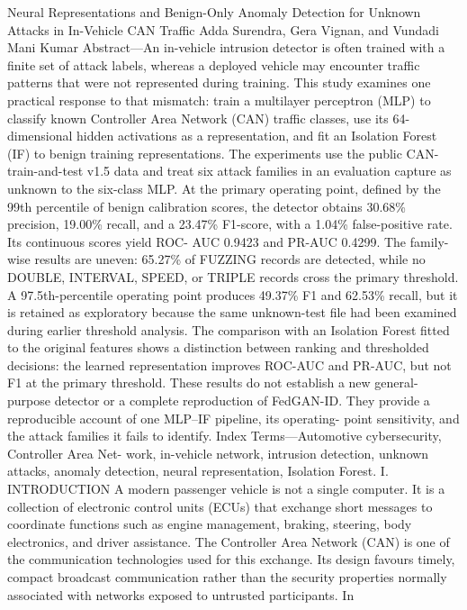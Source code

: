 \documentclass[
]{article}
\author{}
\date{}
\begin{document}
Neural Representations and Benign-Only Anomaly Detection for Unknown
Attacks in In-Vehicle CAN Traffic Adda Surendra, Gera Vignan, and
Vundadi Mani Kumar Abstract---An in-vehicle intrusion detector is often
trained with a finite set of attack labels, whereas a deployed vehicle
may encounter traffic patterns that were not represented during
training. This study examines one practical response to that mismatch:
train a multilayer perceptron (MLP) to classify known Controller Area
Network (CAN) traffic classes, use its 64- dimensional hidden
activations as a representation, and fit an Isolation Forest (IF) to
benign training representations. The experiments use the public
CAN-train-and-test v1.5 data and treat six attack families in an
evaluation capture as unknown to the six-class MLP. At the primary
operating point, defined by the 99th percentile of benign calibration
scores, the detector obtains 30.68\% precision, 19.00\% recall, and a
23.47\% F1-score, with a 1.04\% false-positive rate. Its continuous
scores yield ROC- AUC 0.9423 and PR-AUC 0.4299. The family-wise results
are uneven: 65.27\% of FUZZING records are detected, while no DOUBLE,
INTERVAL, SPEED, or TRIPLE records cross the primary threshold. A
97.5th-percentile operating point produces 49.37\% F1 and 62.53\%
recall, but it is retained as exploratory because the same unknown-test
file had been examined during earlier threshold analysis. The comparison
with an Isolation Forest fitted to the original features shows a
distinction between ranking and thresholded decisions: the learned
representation improves ROC-AUC and PR-AUC, but not F1 at the primary
threshold. These results do not establish a new general-purpose detector
or a complete reproduction of FedGAN-ID. They provide a reproducible
account of one MLP--IF pipeline, its operating- point sensitivity, and
the attack families it fails to identify. Index Terms---Automotive
cybersecurity, Controller Area Net- work, in-vehicle network, intrusion
detection, unknown attacks, anomaly detection, neural representation,
Isolation Forest. I. INTRODUCTION A modern passenger vehicle is not a
single computer. It is a collection of electronic control units (ECUs)
that exchange short messages to coordinate functions such as engine
management, braking, steering, body electronics, and driver assistance.
The Controller Area Network (CAN) is one of the communication
technologies used for this exchange. Its design favours timely, compact
broadcast communication rather than the security properties normally
associated with networks exposed to untrusted participants. In
\end{document}
